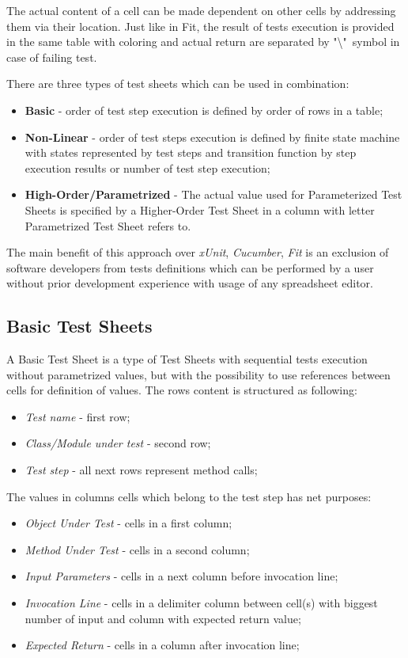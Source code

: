 The actual content of a cell can be made dependent on other cells by addressing them via their location.
Just like in Fit, the result of tests execution is provided in the same table with coloring and actual return are separated by "\textbackslash"\ symbol in case of failing test\cite{tsb}.

There are three types of test sheets which can be used in combination:
\begin{itemize}
	\item \textbf{Basic} - order of test step execution is defined by order of rows in a table;
	\item \textbf{Non-Linear} - order of test steps execution is defined by finite state machine with states represented by test steps and transition function by step execution results or number of test step execution;
	\item \textbf{High-Order/Parametrized} - The actual value used for Parameterized Test Sheets is specified by a Higher-Order Test Sheet in a column with letter Parametrized Test Sheet refers to.
\end{itemize}
The main benefit of this approach over \textit{xUnit}, \textit{Cucumber}, \textit{Fit} is an exclusion of software developers from tests definitions which can be performed by a user without prior development experience with usage of any spreadsheet editor.

 \subsection{Basic Test Sheets}
A Basic Test Sheet is a type of Test Sheets with sequential tests execution without parametrized values, but with the possibility to use references between cells for definition of values.
The rows content is structured as following:
\begin{itemize}
	\item \textit{Test name} - first row;
	\item \textit{Class/Module under test} - second row;
	\item \textit{Test step} - all next rows represent method calls;
\end{itemize}

The values in columns cells which belong to the test step has net purposes:
\begin{itemize}
	\item \textit{Object Under Test} - cells in a first column;
	\item \textit{Method Under Test} - cells in a second column;
	\item \textit{Input Parameters} - cells in a next column before invocation line;
	\item \textit{Invocation Line} - cells in a delimiter column between cell(s) with biggest number of input and column with expected return value;
	\item \textit{Expected Return} - cells in a column after invocation line;
\end{itemize}


